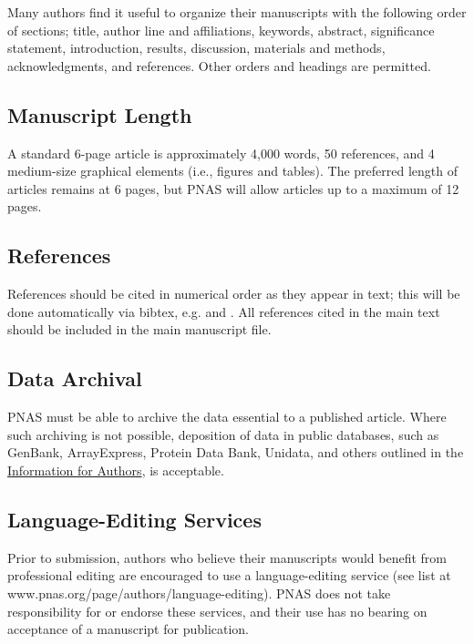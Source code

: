 \documentclass[9pt,twocolumn,twoside,lineno]{pnas-new}
\begin{document}
Many authors find it useful to organize their manuscripts with the following order of sections;  title, author line and affiliations, keywords, abstract, significance statement, introduction, results, discussion, materials and methods, acknowledgments, and references. Other orders and headings are permitted.

\subsection*{Manuscript Length}

A standard 6-page article is approximately 4,000 words, 50 references, and 4 medium-size graphical elements (i.e., figures and tables). The preferred length of articles remains at 6 pages, but PNAS will allow articles up to a maximum of 12 pages.

\subsection*{References}

References should be cited in numerical order as they appear in text; this will be done automatically via bibtex, e.g. \cite{belkin2002using} and \cite{berard1994embedding,coifman2005geometric}. All references cited in the main text should be included in the main manuscript file.

\subsection*{Data Archival}

PNAS must be able to archive the data essential to a published article. Where such archiving is not possible, deposition of data in public databases, such as GenBank, ArrayExpress, Protein Data Bank, Unidata, and others outlined in the \href{https://www.pnas.org/page/authors/journal-policies#xi}{Information for Authors}, is acceptable.

\subsection*{Language-Editing Services}
Prior to submission, authors who believe their manuscripts would benefit from professional editing are encouraged to use a language-editing service (see list at www.pnas.org/page/authors/language-editing). PNAS does not take responsibility for or endorse these services, and their use has no bearing on acceptance of a manuscript for publication. 
\end{document}
